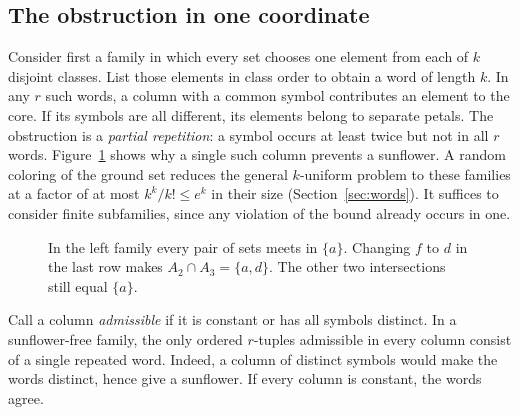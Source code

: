\subsection{The obstruction in one coordinate}\label{sec:overview}

Consider first a family in which every set chooses one element from
each of \(k\) disjoint classes. List those elements in class order
to obtain a word of length \(k\). In any \(r\) such words, a column
with a common symbol contributes an element to the core. If its symbols
are all different, its elements belong to separate petals. The
obstruction is a \emph{partial repetition}: a symbol occurs at least
twice but not in all \(r\) words. Figure~\ref{fig:columns} shows why a
single such column prevents a sunflower. A random coloring of the
ground set reduces the general \(k\)-uniform problem to these families
at a factor of at most \(k^k/k!\le e^k\) in their size
(Section~\ref{sec:words}). It suffices to consider finite subfamilies,
since any violation of the bound already occurs in one.

\begin{figure}[!htb]
\centering
{}
\caption{In the left family every pair of sets meets in \(\{a\}\).
Changing \(f\) to \(d\) in the last row makes \(A_2\cap A_3=\{a,d\}\).
The other two intersections still equal \(\{a\}\).}\label{fig:columns}
\end{figure}

Call a column \emph{admissible} if it is constant or has all symbols
distinct. In a sunflower-free family, the only ordered \(r\)-tuples
admissible in every column consist of a single repeated word. Indeed,
a column of distinct symbols would make the words distinct, hence give
a sunflower. If every column is constant, the words agree.

